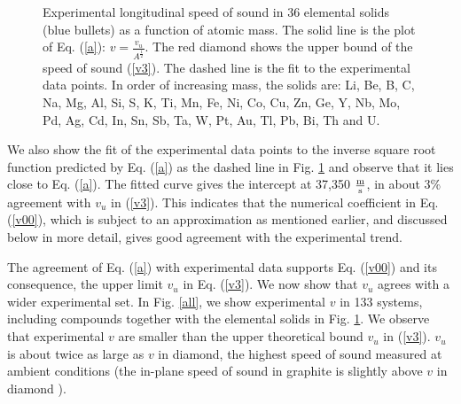 \documentclass[aps,prl,groupedaddress,fleqn,twocolumn,10pt]{revtex4}
\begin{document}
\begin{figure}
{}
\caption{Experimental longitudinal speed of sound \cite{handbook,handbook1,handbook2} in 36 elemental solids (blue bullets) as a function of atomic mass. The solid line is the plot of Eq. (\ref{a}): $v=\frac{v_u}{A^\frac{1}{2}}$. The red diamond shows the upper bound of the speed of sound (\ref{v3}). The dashed line is the fit to the experimental data points. In order of increasing mass, the solids are: Li, Be, B, C, Na, Mg, Al, Si, S, K, Ti, Mn, Fe, Ni, Co, Cu, Zn, Ge, Y, Nb, Mo, Pd, Ag, Cd, In, Sn, Sb, Ta, W, Pt, Au, Tl, Pb, Bi, Th and U.
}
\label{elemental}
\end{figure}

We also show the fit of the experimental data points to the inverse square root function predicted by Eq. (\ref{a}) as the dashed line in Fig. \ref{elemental} and observe that it lies close to Eq. (\ref{a}). The fitted curve gives the intercept at 37,350 $\frac{\rm m}{\rm s}$, in about 3\% agreement with $v_u$ in (\ref{v3}). This indicates that the numerical coefficient in Eq. (\ref{v00}), which is subject to an approximation as mentioned earlier, and discussed below in more detail, gives good agreement with the experimental trend.

The agreement of Eq. (\ref{a}) with experimental data supports Eq. (\ref{v00}) and its consequence, the upper limit $v_u$ in Eq. (\ref{v3}). We now show that $v_u$ agrees with a wider experimental set. In Fig. \ref{all}, we show experimental $v$ \cite{handbook,handbook1,handbook2} in 133 systems, including compounds together with the elemental solids in Fig. \ref{elemental}. We observe that experimental $v$ are smaller than the upper theoretical bound $v_u$ in (\ref{v3}). $v_u$ is about twice as large as $v$ in diamond, the highest speed of sound measured at ambient conditions (the in-plane speed of sound in graphite is slightly above $v$ in diamond \cite{behnia1}).
\end{document}
